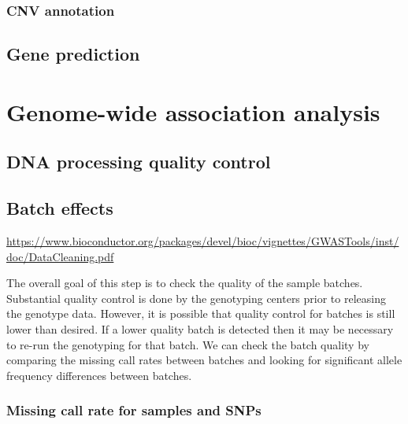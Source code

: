 \documentclass[
]{book}
\begin{document}
\hypertarget{cnv-annotation}{%
\subsection{CNV annotation}\label{cnv-annotation}}

\hypertarget{gene-prediction}{%
\section{Gene prediction}\label{gene-prediction}}

\hypertarget{genome-wide-association-analysis}{%
\chapter{Genome-wide association analysis}\label{genome-wide-association-analysis}}

\hypertarget{dna-processing-quality-control}{%
\section{DNA processing quality control}\label{dna-processing-quality-control}}

\hypertarget{batch-effects}{%
\section{Batch effects}\label{batch-effects}}

\url{https://www.bioconductor.org/packages/devel/bioc/vignettes/GWASTools/inst/doc/DataCleaning.pdf}

The overall goal of this step is to check the quality of the sample batches. Substantial quality control is done by the genotyping centers prior to releasing the genotype data. However, it is possible that quality control for batches is still lower than desired. If a lower quality batch is detected then it may be necessary to re-run the genotyping for that batch. We can check the batch quality by comparing the missing call rates between batches and looking for significant allele frequency differences between batches.

\hypertarget{missing-call-rate-for-samples-and-snps}{%
\subsection{Missing call rate for samples and SNPs}\label{missing-call-rate-for-samples-and-snps}}
\end{document}
